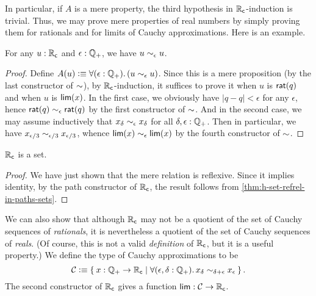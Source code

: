 In particular, if $A$ is a mere property, the third hypothesis in $\mathbb{R}_\mathsf{c}$-induction is trivial.
Thus, we may prove mere properties of real numbers by simply proving them for rationals and for limits of Cauchy approximations.
Here is an example.

\begin{lem}
  For any $u:\mathbb{R}_\mathsf{c}$ and $\epsilon:\mathbb{Q}_{+}$, we have $u\sim_{\epsilon} u$.
\end{lem}
\begin{proof}
  Define $A(u) \defeq \fall{\epsilon:\Qp} (u\close\epsilon u)$.
  Since this is a mere proposition (by the last constructor of $\mathord\sim$), by $\mathbb{R}_\mathsf{c}$-induction, it suffices to prove it when $u$ is $\mathsf{rat}(q)$ and when $u$ is $\mathsf{lim}(x)$.
  In the first case, we obviously have $|q-q|<\epsilon$ for any $\epsilon$, hence $\mathsf{rat}(q) \sim_{\epsilon} \mathsf{rat}(q)$ by the first constructor of $\mathord\sim$.
  And in the second case, we may assume inductively that $x_\delta \sim_{\epsilon} x_\delta$ for all $\delta,\epsilon:\mathbb{Q}_{+}$.
  Then in particular, we have $x_{\epsilon/3} \sim_{\epsilon/3} x_{\epsilon/3}$, whence $\mathsf{lim}(x) \sim_{\epsilon} \mathsf{lim}(x)$ by the fourth constructor of $\mathord\sim$.
\end{proof}

\begin{thm}\label{thm:Cauchy-reals-are-a-set}
  $\mathbb{R}_\mathsf{c}$ is a set.
\end{thm}
\begin{proof}
  We have just shown that the mere relation
  is reflexive.
  Since it implies identity, by the path constructor of $\mathbb{R}_\mathsf{c}$, the result follows from \autoref{thm:h-set-refrel-in-paths-sets}.
\end{proof}

We can also show that although $\mathbb{R}_\mathsf{c}$ may not be a quotient of the set of Cauchy sequences of \emph{rationals}, it is nevertheless a quotient of the set of Cauchy sequences of \emph{reals}.
(Of course, this is not a valid \emph{definition} of $\mathbb{R}_\mathsf{c}$, but it is a useful property.)
We define the type of Cauchy approximations to be
% 
\begin{equation*}
  \CAP \defeq
  \setof{ x : \Qp \to \RC |
    \fall{\epsilon, \delta : \Qp} x_\delta \close{\delta + \epsilon} x_\epsilon
  }.
\end{equation*}
The second constructor of $\mathbb{R}_\mathsf{c}$ gives a function $\mathsf{lim}:\mathcal{C}\to\mathbb{R}_\mathsf{c}$.

